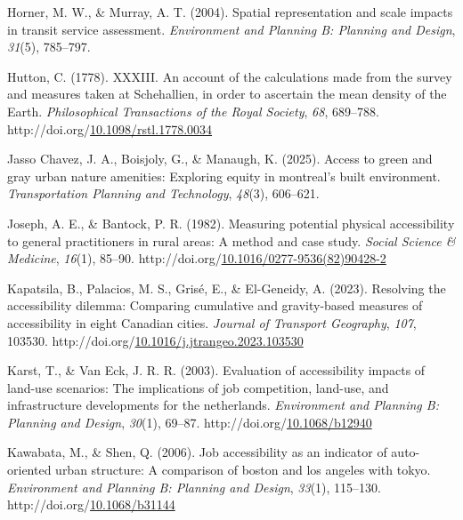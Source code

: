 \documentclass[
11pt, %
oneside, %
english, %
singlespacing, %
]{macthesis} %
\newlength{\cslhangindent}
\newenvironment{CSLReferences}[2] %
{\begin{list}{}{%
	\setlength{\itemindent}{0pt}
	\setlength{\leftmargin}{0pt}
	\setlength{\parsep}{0pt}
	\ifodd #1
	\setlength{\leftmargin}{\cslhangindent}
	\setlength{\itemindent}{-1\cslhangindent}
	\fi
	\setlength{\itemsep}{#2\baselineskip}}}
{\end{list}}
\begin{document}
\begin{CSLReferences}{1}{0}
Horner, M. W., \& Murray, A. T. (2004). Spatial representation and scale impacts in transit service assessment. \emph{Environment and Planning B: Planning and Design}, \emph{31}(5), 785--797.

Hutton, C. (1778). {XXXIII}. {An} account of the calculations made from the survey and measures taken at {Schehallien}, in order to ascertain the mean density of the {Earth}. \emph{Philosophical Transactions of the Royal Society}, \emph{68}, 689--788. http://doi.org/\href{https://doi.org/10.1098/rstl.1778.0034}{10.1098/rstl.1778.0034}

Jasso Chavez, J. A., Boisjoly, G., \& Manaugh, K. (2025). Access to green and gray urban nature amenities: Exploring equity in montreal's built environment. \emph{Transportation Planning and Technology}, \emph{48}(3), 606--621.

Joseph, A. E., \& Bantock, P. R. (1982). Measuring potential physical accessibility to general practitioners in rural areas: A method and case study. \emph{Social Science \& Medicine}, \emph{16}(1), 85--90. http://doi.org/\href{https://doi.org/10.1016/0277-9536(82)90428-2}{10.1016/0277-9536(82)90428-2}

Kapatsila, B., Palacios, M. S., Grisé, E., \& El-Geneidy, A. (2023). Resolving the accessibility dilemma: {Comparing} cumulative and gravity-based measures of accessibility in eight {Canadian} cities. \emph{Journal of Transport Geography}, \emph{107}, 103530. http://doi.org/\href{https://doi.org/10.1016/j.jtrangeo.2023.103530}{10.1016/j.jtrangeo.2023.103530}

Karst, T., \& Van Eck, J. R. R. (2003). Evaluation of accessibility impacts of land-use scenarios: The implications of job competition, land-use, and infrastructure developments for the netherlands. \emph{Environment and Planning B: Planning and Design}, \emph{30}(1), 69--87. http://doi.org/\href{https://doi.org/10.1068/b12940}{10.1068/b12940}

Kawabata, M., \& Shen, Q. (2006). Job accessibility as an indicator of auto-oriented urban structure: A comparison of boston and los angeles with tokyo. \emph{Environment and Planning B: Planning and Design}, \emph{33}(1), 115--130. http://doi.org/\href{https://doi.org/10.1068/b31144}{10.1068/b31144}


\end{CSLReferences}
\end{document}
